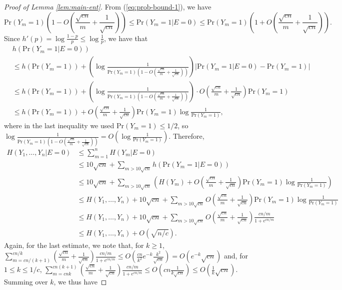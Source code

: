\documentclass[10pt,a4paper]{amsart}
\newcommand{\pr}{\mathrm{Pr}}
\begin{document}
\begin{proof}[Proof of Lemma \ref{lem:main-ent}]
From (\ref{eq:prob-bound-1}), we have
\[
    \pr(Y_m=1) \left(1 - O\left(\frac{\sqrt{cn}}{m} + \frac{1}{\sqrt{cn}}\right)\right)\le \pr(Y_m=1|E=0) \le \pr(Y_m=1) \left(1 + O\left(\frac{\sqrt{cn}}{m} + \frac{1}{\sqrt{cn}}\right)\right).
\]
Since $h'(p) = \log \frac{1-p}{p} \le \log \frac 1p$, we have that 
\begin{align*}
    &h(\pr(Y_m=1|E=0)) \\
    &\le h(\pr(Y_m=1)) + \left (\log \frac{1}{\pr(Y_m=1) \left(1 - O\left(\frac{\sqrt{cn}}{m} + \frac{1}{\sqrt{cn}}\right)\right)}\right ) \left | \pr(Y_m=1|E=0)-\pr(Y_m=1)\right |\\
    &\le h(\pr(Y_m=1)) + \left (\log \frac{1}{\pr(Y_m=1) \left(1 - O\left(\frac{\sqrt{cn}}{m} + \frac{1}{\sqrt{cn}}\right)\right)}\right ) \cdot O\left(\frac{\sqrt{cn}}{m} + \frac{1}{\sqrt{cn}}\right) \pr(Y_m=1) \\
    &\le h(\pr(Y_m=1)) +  O\left(\frac{\sqrt{cn}}{m} + \frac{1}{\sqrt{cn}}\right) \pr(Y_m=1) \log \frac{1}{\pr(Y_m=1)},
\end{align*}
where in the last inequality we used $\pr(Y_m=1) \le 1/2$, so $\log \frac{1}{\pr(Y_m=1) \left(1 - O\left(\frac{\sqrt{cn}}{m} + \frac{1}{\sqrt{cn}}\right)\right)} = O\left(\log \frac{1}{\pr(Y_m=1)}\right)$. 
Therefore, 
\begin{align*}
    H(Y_1,\dots,Y_n|E=0) &\le \sum_{m=1}^{n} H(Y_m | E=0)\\
    &\le 10\sqrt{cn} + \sum_{m>10\sqrt{cn}} h(\pr(Y_m=1|E=0)) \\
    &\le 10\sqrt{cn} + \sum_{m>10\sqrt{cn}} \left(H(Y_m) + O\left(\frac{\sqrt{cn}}{m} + \frac{1}{\sqrt{cn}}\right) \pr(Y_m=1) \log \frac{1}{\pr(Y_m=1)}\right)\\
    &\le H(Y_1,\dots,Y_n) + 10\sqrt{cn} + \sum_{m>10\sqrt{cn}}O\left(\frac{\sqrt{cn}}{m} + \frac{1}{\sqrt{cn}}\right) \pr(Y_m=1) \log \frac{1}{\pr(Y_m=1)}\\
    &\le H(Y_1,\dots,Y_n) + 10\sqrt{cn} + \sum_{m>10\sqrt{cn}} O\left(\frac{\sqrt{cn}}{m} + \frac{1}{\sqrt{cn}}\right) \frac{cn/m}{1+e^{cn/m}}\\
    &\le H(Y_1,\dots,Y_n) + O(\sqrt{n/c}). 
\end{align*}
Again, for the last estimate, we note that, for $k \ge 1$, $\sum_{m=cn/(k+1)}^{cn/k} \left(\frac{\sqrt{cn}}{m} + \frac{1}{\sqrt{cn}}\right) \frac{cn/m}{1+e^{cn/m}} \le O\left(\frac{cn}{k^2} e^{-k}\frac{k^2}{\sqrt{cn}}\right) = O(e^{-k}\sqrt{cn})$  and, for $1\le k\le 1/c$, $\sum_{m=cnk}^{cn(k+1)} \left(\frac{\sqrt{cn}}{m} + \frac{1}{\sqrt{cn}}\right) \frac{cn/m}{1+e^{cn/m}} \le O\left(cn\frac{1}{k\sqrt{cn}}\right) \le O\left(\frac{1}{k}\sqrt{cn}\right)$. Summing over $k$, we thus have 

\end{proof}
\end{document}
